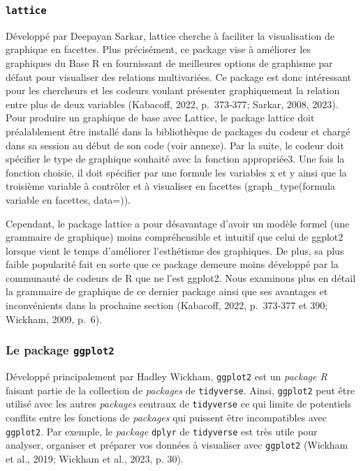 \documentclass[
  letterpaper,
  DIV=11,
  numbers=noendperiod]{scrreprt}
\begin{document}
\hypertarget{lattice}{%
\subsubsection{\texorpdfstring{\texttt{lattice}}{lattice}}\label{lattice}}

Développé par Deepayan Sarkar, lattice cherche à faciliter la
visualisation de graphique en facettes. Plus précisément, ce package
vise à améliorer les graphiques du Base R en fournissant de meilleures
options de graphisme par défaut pour visualiser des relations
multivariées. Ce package est donc intéressant pour les chercheurs et les
codeurs voulant présenter graphiquement la relation entre plus de deux
variables (Kabacoff, 2022, p.~373‑377; Sarkar, 2008, 2023). Pour
produire un graphique de base avec Lattice, le package lattice doit
préalablement être installé dans la bibliothèque de packages du codeur
et chargé dans sa session au début de son code (voir annexe). Par la
suite, le codeur doit spécifier le type de graphique souhaité avec la
fonction appropriée3. Une fois la fonction choisie, il doit spécifier
par une formule les variables x et y ainsi que la troisième variable à
contrôler et à visualiser en facettes (graph\_type(formula \textbar{}
variable en facettes, data=)).

Cependant, le package lattice a pour désavantage d'avoir un modèle
formel (une grammaire de graphique) moins compréhensible et intuitif que
celui de ggplot2 lorsque vient le temps d'améliorer l'esthétisme des
graphiques. De plus, sa plus faible popularité fait en sorte que ce
package demeure moins développé par la communauté de codeurs de R que ne
l'est ggplot2. Nous examinons plus en détail la grammaire de graphique
de ce dernier package ainsi que ses avantages et inconvénients dans la
prochaine section (Kabacoff, 2022, p.~373‑377 et 390; Wickham, 2009,
p.~6).

\hypertarget{le-package-ggplot2}{%
\subsubsection{\texorpdfstring{Le package
\texttt{ggplot2}}{Le package ggplot2}}\label{le-package-ggplot2}}

Développé principalement par Hadley Wickham, \texttt{ggplot2} est un
\emph{package R} faisant partie de la collection de \emph{packages} de
\texttt{tidyverse}. Ainsi, \texttt{ggplot2} peut être utilisé avec les
autres \emph{packages} centraux de \texttt{tidyverse} ce qui limite de
potentiels conflits entre les fonctions de \emph{packages} qui puissent
être incompatibles avec \texttt{ggplot2}. Par exemple, le \emph{package}
\texttt{dplyr} de \texttt{tidyverse} est très utile pour analyser,
organiser et préparer vos données à visualiser avec \texttt{ggplot2}
(Wickham et al., 2019; Wickham et al., 2023, p. 30).
\end{document}
